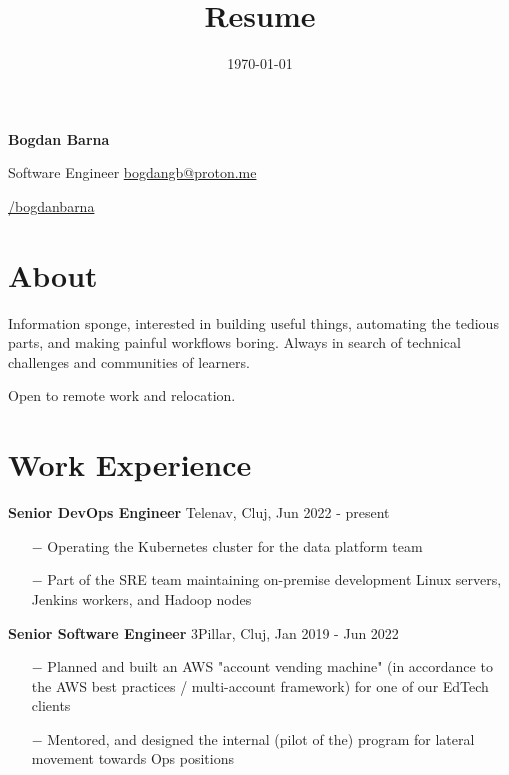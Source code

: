 \documentclass{article}
\title{Resume}
\author{\myname}
\date{\today}
\makeatletter
\newcommand\myname{Bogdan Barna}
\newcommand\myemail{bogdangb@proton.me}
\newcommand\mygithub{bogdanbarna}
\makeatother
\begin{document}
\setlength{\parskip}{2pt}

\begin{center}
    \vspace*{2pt}
    \Large{
    \textbf{\myname}}
\end{center}

\setlength{\parskip}{1pt}
\noindent Software Engineer \hfill
\href{mailto:\myemail}{\myemail}

\href{https://github.com/\mygithub}{\hfill \faGithub/\mygithub}

\setlength{\parskip}{0.1em}

\section*{About}
\indent \par
Information sponge, interested in building useful things, automating the tedious parts, and
making painful workflows boring. Always in search of technical challenges and communities of learners.\par
Open to remote work and relocation.

\section*{Work Experience}
\indent

\textbf{Senior DevOps Engineer} \hfill Telenav, Cluj, Jun 2022 - present
\begin{itemize}
    \item[$-$] Operating the Kubernetes cluster for the data platform team
    \item[$-$] Part of the SRE team maintaining on-premise development Linux servers, Jenkins workers, and Hadoop nodes
\end{itemize}

\textbf{Senior Software Engineer} \hfill 3Pillar, Cluj, Jan 2019 - Jun 2022

\begin{itemize}
    \item[$-$] Planned and built an AWS "account vending machine" (in accordance to the AWS best practices / multi-account framework) for one of our EdTech clients
    \item[$-$] Mentored, and designed the internal (pilot of the) program for lateral movement towards Ops positions
\end{itemize}
\end{document}

